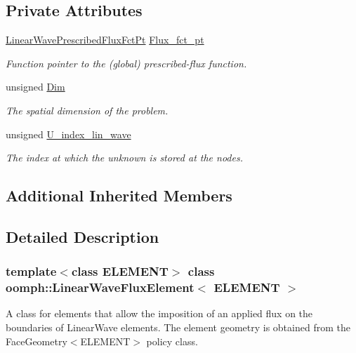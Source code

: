 \subsection*{Private Attributes}
\begin{DoxyCompactItemize}
\item 
\hyperlink{classoomph_1_1LinearWaveFluxElement_a4010abac8856733ae2b152bc41e7b558}{Linear\+Wave\+Prescribed\+Flux\+Fct\+Pt} \hyperlink{classoomph_1_1LinearWaveFluxElement_a91d78912959e683d299a6778590957d2}{Flux\+\_\+fct\+\_\+pt}
\begin{DoxyCompactList}\small\item\em Function pointer to the (global) prescribed-\/flux function. \end{DoxyCompactList}\item 
unsigned \hyperlink{classoomph_1_1LinearWaveFluxElement_a7c846cb5877fbf923be7a42a5b24f926}{Dim}
\begin{DoxyCompactList}\small\item\em The spatial dimension of the problem. \end{DoxyCompactList}\item 
unsigned \hyperlink{classoomph_1_1LinearWaveFluxElement_a6a5e0e000ee602797262490bc49c49e2}{U\+\_\+index\+\_\+lin\+\_\+wave}
\begin{DoxyCompactList}\small\item\em The index at which the unknown is stored at the nodes. \end{DoxyCompactList}\end{DoxyCompactItemize}
\subsection*{Additional Inherited Members}


\subsection{Detailed Description}
\subsubsection*{template$<$class E\+L\+E\+M\+E\+NT$>$\newline
class oomph\+::\+Linear\+Wave\+Flux\+Element$<$ E\+L\+E\+M\+E\+N\+T $>$}

A class for elements that allow the imposition of an applied flux on the boundaries of Linear\+Wave elements. The element geometry is obtained from the Face\+Geometry$<$\+E\+L\+E\+M\+E\+N\+T$>$ policy class. 

